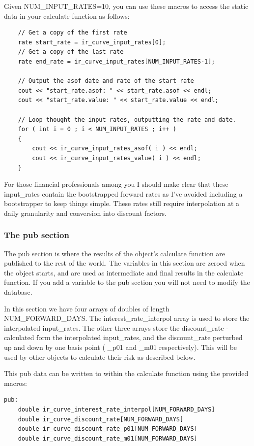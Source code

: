 \documentclass{report}
\begin{document}
Given NUM_INPUT_RATES=10, you can use these macros to access the static data in your calculate function as follows:

\begin{verbatim}
    // Get a copy of the first rate
    rate start_rate = ir_curve_input_rates[0];
    // Get a copy of the last rate
    rate end_rate = ir_curve_input_rates[NUM_INPUT_RATES-1];

    // Output the asof date and rate of the start_rate
    cout << "start_rate.asof: " << start_rate.asof << endl;
    cout << "start_rate.value: " << start_rate.value << endl;

    // Loop thought the input rates, outputting the rate and date.
    for ( int i = 0 ; i < NUM_INPUT_RATES ; i++ )
    {
        cout << ir_curve_input_rates_asof( i ) << endl;
        cout << ir_curve_input_rates_value( i ) << endl;
    }
\end{verbatim}

For those financial professionals among you I should make clear that these input_rates contain the bootstrapped forward rates as I've avoided including a bootstrapper to keep things simple. These rates still require interpolation at a daily granularity and conversion into discount factors.

\subsubsection{The pub section}

The pub section is where the results of the object's calculate function are published to the rest of the world. The variables in this section are zeroed when the object starts, and are used as intermediate and final results in the calculate function. If you add a variable to the pub section you will not need to modify the database.  

In this section we have four arrays of doubles of length NUM_FORWARD_DAYS. The interest_rate_interpol array is used to store the interpolated input_rates. The other three arrays store the discount_rate - calculated form the interpolated input_rates, and the discount_rate perturbed up and down by one basis point ( _p01 and _m01 respectively). This will be used by other objects to calculate their risk as described below. 

This pub data can be written to within the calculate function using the provided macros:
\begin{verbatim}
pub:
    double ir_curve_interest_rate_interpol[NUM_FORWARD_DAYS]
    double ir_curve_discount_rate[NUM_FORWARD_DAYS]
    double ir_curve_discount_rate_p01[NUM_FORWARD_DAYS]
    double ir_curve_discount_rate_m01[NUM_FORWARD_DAYS]
\end{verbatim}
\end{document}
